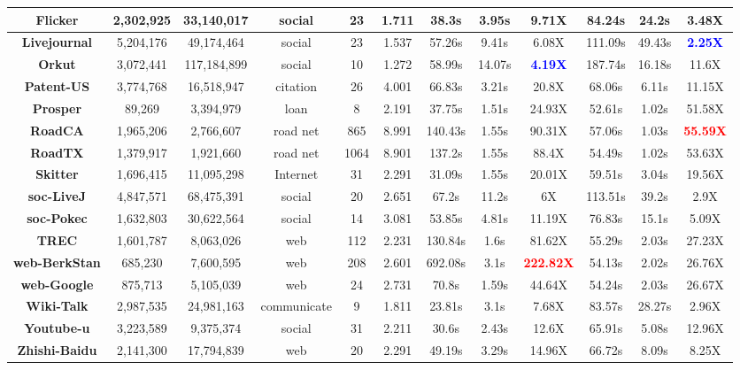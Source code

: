 \begin{table}[!t]
\begin{tabular}{c|c|c|c|c|c|c|c|c|c|c|c}
		\textbf{Flicker} & 2,302,925 & 33,140,017 & social & 23 & 1.711 & 38.3s & 3.95s & 9.71X & 84.24s & 24.2s & 3.48X \\
		\hline
		\textbf{Livejournal} & 5,204,176 & 49,174,464 & social & 23 & 1.537 & 57.26s & 9.41s & 6.08X & 111.09s & 49.43s & \textcolor{blue}{\textbf{2.25X}} \\
		\hline
		\textbf{Orkut} & 3,072,441 & 117,184,899 & social & 10 & 1.272 & 58.99s & 14.07s & \textcolor{blue}{\textbf{4.19X}} & 187.74s & 16.18s & 11.6X \\
		\hline
		\textbf{Patent-US} & 3,774,768 & 16,518,947 & citation & 26 & 4.001 & 66.83s & 3.21s & 20.8X & 68.06s & 6.11s & 11.15X \\
		\hline
		\textbf{Prosper} & 89,269 & 3,394,979 & loan & 8 & 2.191 & 37.75s & 1.51s & 24.93X & 52.61s & 1.02s & 51.58X \\
		\hline
		\textbf{RoadCA} & 1,965,206 & 2,766,607 & road net & 865 & 8.991 & 140.43s & 1.55s & 90.31X & 57.06s & 1.03s & \textcolor{red}{\textbf{55.59X}} \\
		\hline
		\textbf{RoadTX} & 1,379,917 & 1,921,660 & road net & 1064 & 8.901 & 137.2s & 1.55s & 88.4X & 54.49s & 1.02s & 53.63X \\
		\hline
		\textbf{Skitter} & 1,696,415 & 11,095,298 & Internet & 31 & 2.291 & 31.09s & 1.55s & 20.01X & 59.51s & 3.04s & 19.56X \\
		\hline
		\textbf{soc-LiveJ} & 4,847,571 & 68,475,391 & social & 20 & 2.651 & 67.2s & 11.2s & 6X & 113.51s & 39.2s & 2.9X \\
		\hline
		\textbf{soc-Pokec} & 1,632,803 & 30,622,564 & social & 14 & 3.081 & 53.85s & 4.81s & 11.19X & 76.83s & 15.1s & 5.09X \\
		\hline
		\textbf{TREC} & 1,601,787 & 8,063,026 & web & 112 & 2.231 & 130.84s & 1.6s & 81.62X & 55.29s & 2.03s & 27.23X \\
		\hline
		\textbf{\footnotesize{web-BerkStan}} & 685,230 & 7,600,595 & web & 208 & 2.601 & 692.08s & 3.1s & \textcolor{red}{\textbf{222.82X}} & 54.13s & 2.02s & 26.76X \\
		\hline
		\textbf{web-Google} & 875,713 & 5,105,039 & web & 24 & 2.731 & 70.8s & 1.59s & 44.64X & 54.24s & 2.03s & 26.67X \\
		\hline
		\textbf{Wiki-Talk} & 2,987,535 & 24,981,163 & \footnotesize{communicate} & 9 & 1.811 & 23.81s & 3.1s & 7.68X & 83.57s & 28.27s & 2.96X \\
		\hline
		\textbf{Youtube-u} & 3,223,589  & 9,375,374 & social & 31 & 2.211 & 30.6s & 2.43s & 12.6X & 65.91s & 5.08s & 12.96X \\
		\hline
		\textbf{\footnotesize{Zhishi-Baidu}} & 2,141,300 & 17,794,839 & web & 20 & 2.291 & 49.19s & 3.29s & 14.96X & 66.72s & 8.09s & 8.25X\\
		\hline
	\end{tabular}
	\vspace{-0.1in}
\end{table}
